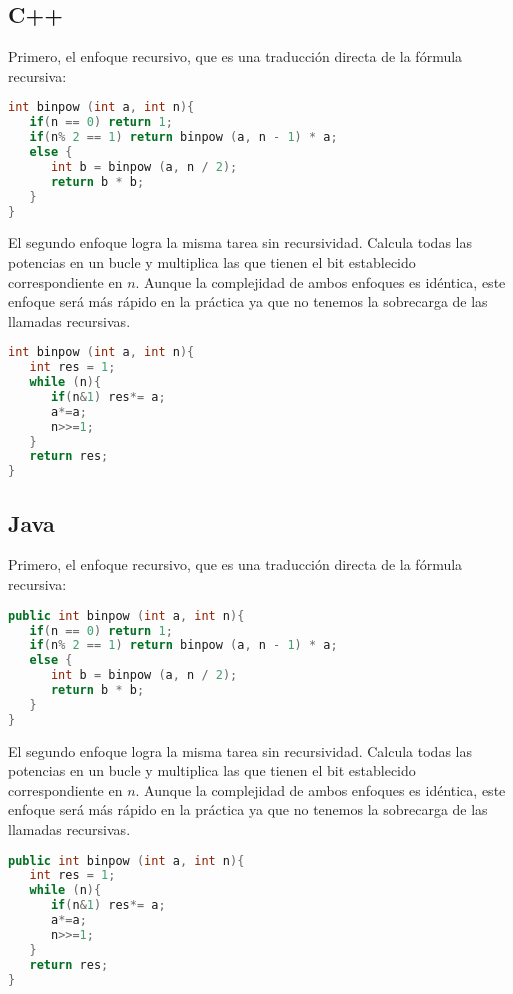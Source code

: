\subsection{C++}

Primero, el enfoque recursivo, que es una traducción directa de la fórmula recursiva:

\begin{lstlisting}[language=C++]
int binpow (int a, int n){
   if(n == 0) return 1; 
   if(n% 2 == 1) return binpow (a, n - 1) * a; 
   else {
      int b = binpow (a, n / 2); 
      return b * b;
   }
}
\end{lstlisting}

El segundo enfoque logra la misma tarea sin recursividad. Calcula todas las potencias en un bucle y multiplica las que tienen el bit establecido correspondiente en $n$. Aunque la complejidad de ambos enfoques es idéntica, este enfoque será más rápido en la práctica ya que no tenemos la sobrecarga de las llamadas recursivas.

\begin{lstlisting}[language=C++]
int binpow (int a, int n){
   int res = 1; 
   while (n){
      if(n&1) res*= a;
      a*=a;
      n>>=1;
   } 
   return res;
}
\end{lstlisting}

\subsection{Java}

Primero, el enfoque recursivo, que es una traducción directa de la fórmula recursiva:

\begin{lstlisting}[language=C++]
public int binpow (int a, int n){
   if(n == 0) return 1; 
   if(n% 2 == 1) return binpow (a, n - 1) * a; 
   else {
      int b = binpow (a, n / 2); 
      return b * b;
   }
}
\end{lstlisting}

El segundo enfoque logra la misma tarea sin recursividad. Calcula todas las potencias en un bucle y multiplica las que tienen el bit establecido correspondiente en $n$. Aunque la complejidad de ambos enfoques es idéntica, este enfoque será más rápido en la práctica ya que no tenemos la sobrecarga de las llamadas recursivas.

\begin{lstlisting}[language=C++]
public int binpow (int a, int n){
   int res = 1; 
   while (n){
      if(n&1) res*= a;
      a*=a;
      n>>=1;
   } 
   return res;
}
\end{lstlisting}